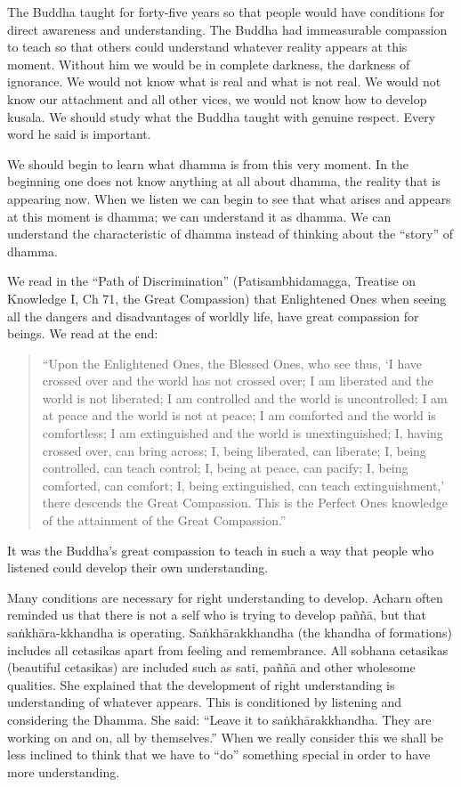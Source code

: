 The Buddha taught for forty-five years so that people would have
conditions for direct awareness and understanding. The Buddha had
immeasurable compassion to teach so that others could understand
whatever reality appears at this moment. Without him we would be in
complete darkness, the darkness of ignorance. We would not know what is
real and what is not real. We would not know our attachment and all
other vices, we would not know how to develop kusala. We should study
what the Buddha taught with genuine respect. Every word he said is
important.

We should begin to learn what dhamma is from this very moment. In the
beginning one does not know anything at all about dhamma, the reality
that is appearing now. When we listen we can begin to see that what
arises and appears at this moment is dhamma; we can understand it as
dhamma. We can understand the characteristic of dhamma instead of
thinking about the ``story'' of dhamma.

We read in the ``Path of Discrimination'' (Patisambhidamagga, Treatise
on Knowledge I, Ch 71, the Great Compassion) that Enlightened Ones when
seeing all the dangers and disadvantages of worldly life, have great
compassion for beings. We read at the end:

\begin{quote}
``Upon the Enlightened Ones, the Blessed Ones, who see thus, `I have
crossed over and the world has not crossed over; I am liberated and the
world is not liberated; I am controlled and the world is uncontrolled; I
am at peace and the world is not at peace; I am comforted and the world
is comfortless; I am extinguished and the world is unextinguished; I,
having crossed over, can bring across; I, being liberated, can liberate;
I, being controlled, can teach control; I, being at peace, can pacify;
I, being comforted, can comfort; I, being extinguished, can teach
extinguishment,' there descends the Great Compassion. This is the
Perfect Ones knowledge of the attainment of the Great Compassion.''
\end{quote}

It was the Buddha's great compassion to teach in such a way that people
who listened could develop their own understanding.

Many conditions are necessary for right understanding to develop. Acharn
often reminded us that there is not a self who is trying to develop
paññā, but that saṅkhāra-kkhandha is operating. Saṅkhārakkhandha (the
khandha of formations) includes all cetasikas apart from feeling and
remembrance. All sobhana cetasikas (beautiful cetasikas) are included
such as sati, paññā and other wholesome qualities. She explained that
the development of right understanding is understanding of whatever
appears. This is conditioned by listening and considering the Dhamma.
She said: ``Leave it to saṅkhārakkhandha. They are working on and on,
all by themselves.'' When we really consider this we shall be less
inclined to think that we have to ``do'' something special in order to
have more understanding.

